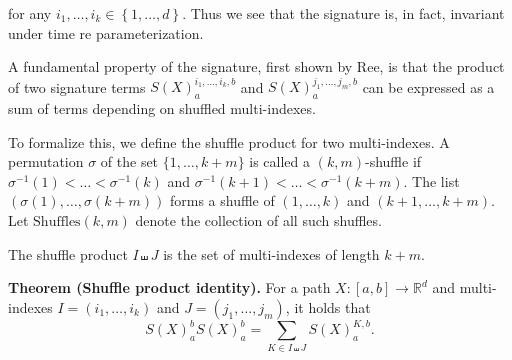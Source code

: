 for any $i_{1},\ldots, i_{k} \in  \left\{ 1,\ldots,d \right\} $. Thus we see that the signature is, in fact, invariant under time re parameterization.

A fundamental property of the signature, first shown by Ree, is that the product of two signature terms \( S(X)_a^{i_1,\dots,i_k,b} \) and \( S(X)_a^{j_1,\dots,j_m,b} \) can be expressed as a sum of terms depending on shuffled multi-indexes.

To formalize this, we define the shuffle product for two multi-indexes. A permutation \( \sigma \) of the set \( \{1, \dots, k+m\} \) is called a \((k,m)\)-shuffle if \( \sigma^{-1}(1) < \dots < \sigma^{-1}(k) \) and \( \sigma^{-1}(k+1) < \dots < \sigma^{-1}(k+m) \). The list \( (\sigma(1), \dots, \sigma(k+m)) \) forms a shuffle of \( (1, \dots, k) \) and \( (k+1, \dots, k+m) \). Let \( \text{Shuffles}(k,m) \) denote the collection of all such shuffles.

\[
\]
The shuffle product \( I \shuffle J \) is the set of multi-indexes of length \( k+m \).

\textbf{Theorem (Shuffle product identity).} For a path \( X: [a,b] \to \mathbb{R}^d \) and multi-indexes \( I = (i_1, \dots, i_k) \) and \( J = (j_1, \dots, j_m) \), it holds that
\[
S(X)_a^b S(X)_a^b = \sum_{K \in I \shuffle J} S(X)_a^{K,b}.
\]
